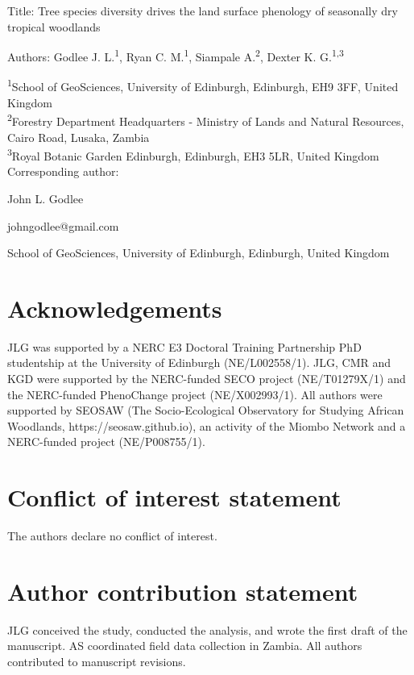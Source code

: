 \documentclass[11pt,a4paper]{article}
\begin{document}
{\Large{Title: Tree species diversity drives the land surface phenology of seasonally dry tropical woodlands}}

Authors: Godlee J. L.\textsuperscript{1}, Ryan C. M.\textsuperscript{1}, Siampale A.\textsuperscript{2}, Dexter K. G.\textsuperscript{1,3}

\textsuperscript{1}School of GeoSciences, University of Edinburgh, Edinburgh, EH9 3FF, United Kingdom \\
\textsuperscript{2}Forestry Department Headquarters - Ministry of Lands and Natural Resources, Cairo Road, Lusaka, Zambia \\
\textsuperscript{3}Royal Botanic Garden Edinburgh, Edinburgh, EH3 5LR, United Kingdom \\

\vspace{1em}
Corresponding author:

John L. Godlee

johngodlee@gmail.com

School of GeoSciences, University of Edinburgh, Edinburgh, United Kingdom

\section*{Acknowledgements}

JLG was supported by a NERC E3 Doctoral Training Partnership PhD studentship at
the University of Edinburgh (NE/L002558/1). JLG, CMR and KGD were supported by
the NERC-funded SECO project (NE/T01279X/1) and the NERC-funded PhenoChange
project (NE/X002993/1). All authors were supported by SEOSAW (The
Socio-Ecological Observatory for Studying African Woodlands,
https://seosaw.github.io), an activity of the Miombo Network and a NERC-funded
project (NE/P008755/1). 

\section*{Conflict of interest statement}

The authors declare no conflict of interest. 

\section*{Author contribution statement}

JLG conceived the study, conducted the analysis, and wrote the first draft of
the manuscript. AS coordinated field data collection in Zambia. All authors
contributed to manuscript revisions. 
\end{document}
